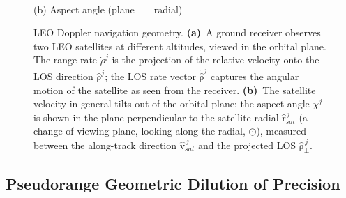 \documentclass[letterpaper,times]{IONconf-v2}
\theoremstyle{plain}
\theoremstyle{remark}
\renewcommand{\vec}[1]{{\boldsymbol{\mathrm{#1}}}}
\begin{document}
\begin{figure}[htbp!]
\begin{minipage}[b]{0.34\textwidth}
{%
}
\\[3pt]{\footnotesize (b) Aspect angle (plane $\perp$ radial)}
\end{minipage}
\caption{LEO Doppler navigation geometry. \textbf{(a)}~A ground receiver observes two LEO satellites at different altitudes, viewed in the orbital plane. The range rate $\dot{\rho}^j$ is the projection of the relative velocity onto the LOS direction $\hat{\vec\rho}^j$; the LOS rate vector $\dot{\hat{\vec\rho}}^j$ captures the angular motion of the satellite as seen from the receiver. \textbf{(b)}~The satellite velocity in general tilts out of the orbital plane; the aspect angle $\chi^j$ is shown in the plane perpendicular to the satellite radial $\hat{\vec r}_{sat}^{\,j}$ (a change of viewing plane, looking along the radial, $\odot$), measured between the along-track direction $\hat{\vec v}_{sat}^{\,j}$ and the projected LOS $\hat{\vec\rho}_\perp^{\,j}$.}
\label{fig:doppler_geometry}

\end{figure}

\vspace{-10pt}

\subsection{Pseudorange Geometric Dilution of Precision}\label{subsec:pr_gdop}
\end{document}
